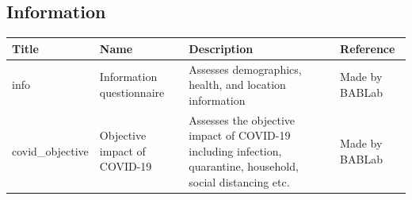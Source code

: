 \documentclass[]{book}
\begin{document}
\hypertarget{information}{%
\subsection{Information}\label{information}}

\begin{longtable}[]{@{}llll@{}}
\toprule
\begin{minipage}[b]{0.22\columnwidth}\raggedright
Title\strut
\end{minipage} & \begin{minipage}[b]{0.27\columnwidth}\raggedright
Name\strut
\end{minipage} & \begin{minipage}[b]{0.22\columnwidth}\raggedright
Description\strut
\end{minipage} & \begin{minipage}[b]{0.18\columnwidth}\raggedright
Reference\strut
\end{minipage}\tabularnewline
\midrule
\endhead
\begin{minipage}[t]{0.22\columnwidth}\raggedright
info\strut
\end{minipage} & \begin{minipage}[t]{0.27\columnwidth}\raggedright
Information questionnaire\strut
\end{minipage} & \begin{minipage}[t]{0.22\columnwidth}\raggedright
Assesses demographics, health, and location information\strut
\end{minipage} & \begin{minipage}[t]{0.18\columnwidth}\raggedright
Made by BABLab\strut
\end{minipage}\tabularnewline
\begin{minipage}[t]{0.22\columnwidth}\raggedright
covid\_objective\strut
\end{minipage} & \begin{minipage}[t]{0.27\columnwidth}\raggedright
Objective impact of COVID-19\strut
\end{minipage} & \begin{minipage}[t]{0.22\columnwidth}\raggedright
Assesses the objective impact of COVID-19 including infection, quarantine, household, social distancing etc.\strut
\end{minipage} & \begin{minipage}[t]{0.18\columnwidth}\raggedright
Made by BABLab\strut
\end{minipage}\tabularnewline
\bottomrule
\end{longtable}
\end{document}
